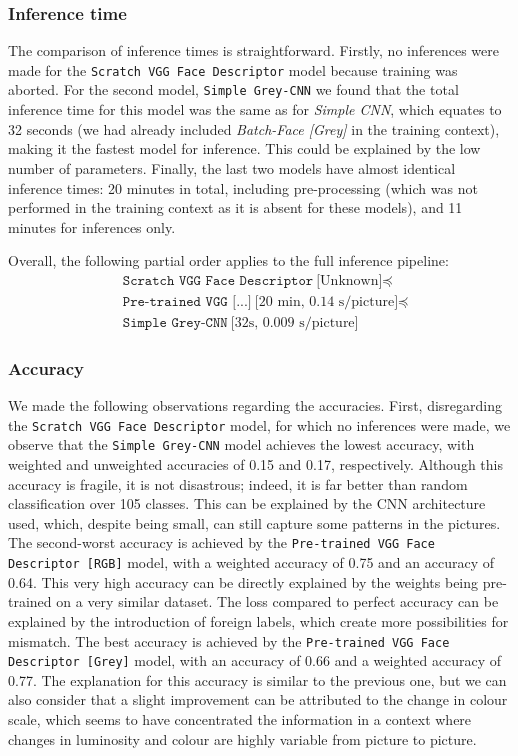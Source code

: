 \documentclass[9pt,twocolumn,twoside]{ilcss}
\theoremstyle{definition}
\theoremstyle{remark}
\theoremstyle{definition}
\theoremstyle{definition}
\begin{document}
    \subsubsection*{Inference time}
    The comparison of inference times is straightforward. Firstly, no inferences were made for the \texttt{Scratch VGG Face Descriptor} model because training was aborted.
    For the second model, \texttt{Simple Grey-CNN} we found that the total inference time for this model was the same as for \textit{Simple CNN}, which equates to 32 seconds (we had already included \textit{Batch-Face [Grey]} in the training context), making it the fastest model for inference. This could be explained by the low number of parameters.
    Finally, the last two models have almost identical inference times: 20 minutes in total, including pre-processing (which was not performed in the training context as it is absent for these models), and 11 minutes for inferences only.
    
    Overall, the following partial order applies to the full inference pipeline:
    \begin{align*}
       & \texttt{Scratch VGG Face Descriptor}\ \text{[Unknown]} \preceq\\ 
       & \texttt{Pre-trained VGG [...]}\ \text{[20 min, 0.14 s/picture]}\preceq\\
       & \texttt{Simple Grey-CNN}\ \text{[32s, 0.009 s/picture]}
    \end{align*}

    \subsubsection*{Accuracy}
    We made the following observations regarding the accuracies. First, disregarding the \texttt{Scratch VGG Face Descriptor} model, for which no inferences were made, we observe that the \texttt{Simple Grey-CNN} model achieves the lowest accuracy, with weighted and unweighted accuracies of 0.15 and 0.17, respectively. Although this accuracy is fragile, it is not disastrous; indeed, it is far better than random classification over 105 classes. This can be explained by the CNN architecture used, which, despite being small, can still capture some patterns in the pictures.
    The second-worst accuracy is achieved by the \texttt{Pre-trained VGG Face Descriptor [RGB]} model, with a weighted accuracy of 0.75 and an accuracy of 0.64. This very high accuracy can be directly explained by the weights being pre-trained on a very similar dataset. The loss compared to perfect accuracy can be explained by the introduction of foreign labels, which create more possibilities for mismatch.
    The best accuracy is achieved by the \texttt{Pre-trained VGG Face Descriptor [Grey]} model, with an accuracy of 0.66 and a weighted accuracy of 0.77. The explanation for this accuracy is similar to the previous one, but we can also consider that a slight improvement can be attributed to the change in colour scale, which seems to have concentrated the information in a context where changes in luminosity and colour are highly variable from picture to picture.
\end{document}
